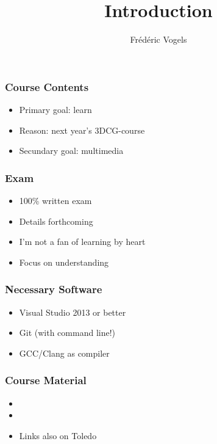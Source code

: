 \documentclass{../ucll-slides}
\title{Introduction}
\author{Fr\'ed\'eric Vogels}
\begin{document}
\begin{frame}
  \titlepage
\end{frame}

\begin{frame}
  \frametitle{Course Contents}
  \Large
  \begin{itemize}
    \item Primary goal: learn \cpp
    \item Reason: next year's 3DCG-course
    \item Secundary goal: multimedia
  \end{itemize}
\end{frame}

\begin{frame}
  \frametitle{Exam}
  \Large
  \begin{itemize}
    \item 100\% written exam
    \item Details forthcoming
    \item I'm not a fan of learning by heart
    \item Focus on understanding
  \end{itemize}
\end{frame}

\begin{frame}
  \frametitle{Necessary Software}
  \Large
  \begin{itemize}
    \item Visual Studio 2013 or better
    \item Git (with command line!)
  \end{itemize}
  \vskip5mm
  \begin{itemize}
    \item GCC/Clang as compiler
  \end{itemize}
\end{frame}

\begin{frame}
  \frametitle{Course Material} \Large
  \begin{itemize}
    \item {}
    \item {}
    \item Links also on Toledo
  \end{itemize}
\end{frame}
\end{document}
